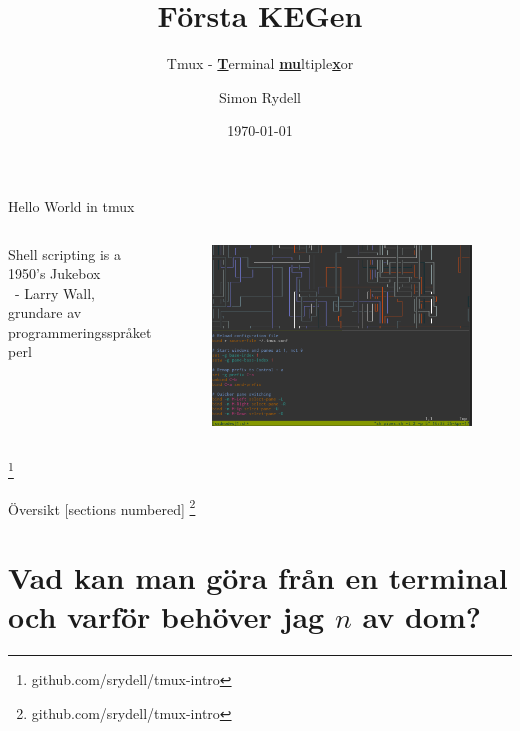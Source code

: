 \documentclass[10pt]{beamer}
\title{Första KEGen}
\subtitle{Tmux - \underline{\textbf{T}}erminal \underline{\textbf{mu}}ltiple\underline{\textbf{x}}or}
\date{\today}
\author{Simon Rydell}
\institute{Systecon}
\newcommand\blfootnote[1]{%
  \begingroup
  \renewcommand\thefootnote{}\footnote{#1}%
  \addtocounter{footnote}{-1}%
  \endgroup
}
\begin{document}
\begin{frame}
\titlepage
\end{frame}

% 
\begin{frame}{Hello World in tmux}
    \begin{columns}[c]
        \column{2in}
            Shell scripting is a 1950's Jukebox \\
                \ - Larry Wall, \\
                \small grundare av programmeringsspråket perl
        \column{2in}
            \begin{figure}[h!]
                \centering
                \includegraphics[width=1\textwidth]{../figures/tmux0.png}
            \end{figure}
    \end{columns}
    \blfootnote{github.com/srydell/tmux-intro}
\end{frame}

% 
\begin{frame}{Översikt}
    [sections numbered]
    \tableofcontents[hideallsubsections]
    \blfootnote{github.com/srydell/tmux-intro}
\end{frame}

\section{Vad kan man göra från en terminal och varför behöver jag $n$ av dom?}
\end{document}
